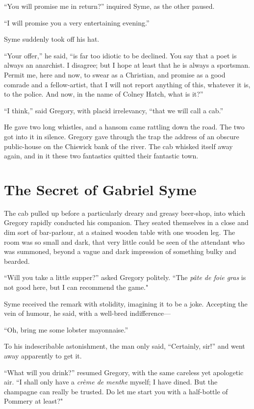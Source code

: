 \documentclass{book}
\begin{document}
“You will promise me in return?” inquired Syme, as the other paused.

“I will promise you a very entertaining evening.”

Syme suddenly took off his hat.

“Your offer,” he said, “is far too idiotic to be declined. You say that a poet is always an anarchist. I disagree; but I hope at least that he is always a sportsman. Permit me, here and now, to swear as a Christian, and promise as a good comrade and a fellow-artist, that I will not report anything of this, whatever it is, to the police. And now, in the name of Colney Hatch, what is it?”

“I think,” said Gregory, with placid irrelevancy, “that we will call a cab.”

He gave two long whistles, and a hansom came rattling down the road. The two got into it in silence. Gregory gave through the trap the address of an obscure public-house on the Chiswick bank of the river. The cab whisked itself away again, and in it these two fantastics quitted their fantastic town.

\chapter{The Secret of Gabriel Syme}
\label{chapter-1}
The cab pulled up before a particularly dreary and greasy beer-shop, into which Gregory rapidly conducted his companion. They seated themselves in a close and dim sort of bar-parlour, at a stained wooden table with one wooden leg. The room was so small and dark, that very little could be seen of the attendant who was summoned, beyond a vague and dark impression of something bulky and bearded.

“Will you take a little supper?” asked Gregory politely. “The \emph{pâte de foie gras} is not good here, but I can recommend the game."

Syme received the remark with stolidity, imagining it to be a joke. Accepting the vein of humour, he said, with a well-bred indifference—

“Oh, bring me some lobster mayonnaise.”

To his indescribable astonishment, the man only said, “Certainly, sir!” and went away apparently to get it.

“What will you drink?” resumed Gregory, with the same careless yet apologetic air. “I shall only have a \emph{crème de menthe} myself; I have dined. But the champagne can really be trusted. Do let me start you with a half-bottle of Pommery at least?"
\end{document}
